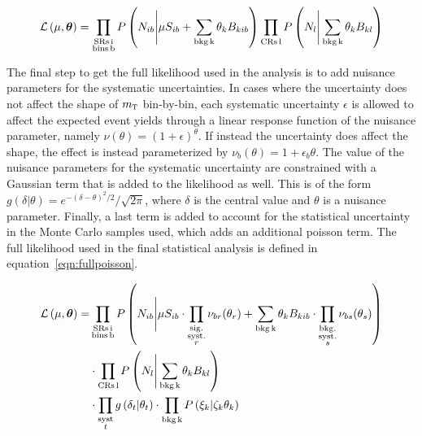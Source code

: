 \begin{equation}
\mathcal{L}\left(\mu, \hbox{\bm{$\theta$}}\right) = \prod_{\substack{\rm{SRs }\, i \\ \rm{bins }\, b}} P\left(N_{ib} \Bigg| \mu S_{ib} + \sum_{\rm{bkg }\, k}\theta_{k} B_{kib}\right)
 \prod_{\substack{\rm{CRs} \, l}} P\left(N_{l} \Bigg| \sum_{\rm{bkg }\, k}\theta_{k} B_{kl}\right)
\label{eqn:binnedpoisson}
\end{equation}

The final step to get the full likelihood used in the analysis is to add nuisance parameters for the systematic uncertainties. In cases where the uncertainty does not affect the shape of $m_{\textrm{\footnotesize\sc t}}$ bin-by-bin, each systematic uncertainty $\epsilon$ is allowed to affect the expected event yields through a linear response function of the nuisance parameter, namely $\nu(\theta) = (1 + \epsilon)^\theta$. If instead the uncertainty does affect the shape, the effect is instead parameterized by $\nu_b(\theta) = 1 + \epsilon_{b}\theta$. The value of the nuisance parameters for the systematic uncertainty are constrained with a Gaussian term that is added to the likelihood as well. This is of the form $g(\delta | \theta) = e^{-(\delta - \theta)^2/2}/\sqrt{2\pi}$, where $\delta$ is the central value and $\theta$ is a nuisance parameter. Finally, a last term is added to account for the statistical uncertainty in the Monte Carlo samples used, which adds an additional poisson term. The full likelihood used in the final statistical analysis is defined in equation~\ref{eqn:fullpoisson}.

\begin{equation}
\begin{aligned}
\mathcal{L}\left(\mu, \hbox{\bm{$\theta$}}\right) = & \prod_{\substack{\rm{SRs }\, i \\ \rm{bins }\, b}} P\left(N_{ib} \Bigg| \mu S_{ib} \cdot \prod_{\substack{\rm{sig.} \\ \rm{syst.} \\ r}} \nu_{br}(\theta_{r})
 + \sum_{\rm{bkg }\, k}\theta_{k} B_{kib} \cdot \prod_{\substack{\rm{bkg.} \\ \rm{syst.} \\ s}} \nu_{bs}(\theta_{s}) \right)
 \\ & \cdot \prod_{\substack{\rm{CRs} \, l}} P\left(N_{l} \Bigg| \sum_{\rm{bkg }\, k}\theta_{k} B_{kl}\right)
 \\ & \cdot \prod_{\substack{\rm syst \\ t}} g\left(\delta_{t} | \theta_{t}\right)
 \cdot \prod_{\substack{\rm bkg \, k}} P\left(\xi_k | \zeta_{k} \theta_{k}\right)
\end{aligned}
\label{eqn:fullpoisson}
\end{equation}

